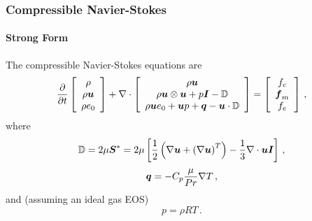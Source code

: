 \documentclass[18pt,xcolor=table]{beamer}
\begin{document}

\begin{frame}[t]
\frametitle{Compressible Navier-Stokes}
\framesubtitle{Strong Form}  %
The compressible Navier-Stokes equations are
\begin{align*}
\frac{\partial}{\partial t}\left[ \begin{array}{c} \rho\\ \rho\boldsymbol u\\ \rho e_0\\ \end{array} \right]
+\nabla\cdot\left[ \begin{array}{c} \rho\boldsymbol u\\ \rho\boldsymbol u\otimes\boldsymbol u+p\boldsymbol I-\mathbb{D}\\ \rho\boldsymbol u e_0+\boldsymbol u p+\boldsymbol q-\boldsymbol u\cdot\mathbb{D}\\ \end{array} \right]
=\left[ \begin{array}{c} f_c\\ \boldsymbol f_m\\ f_e\\ \end{array} \right]\,,
\end{align*}
where
\begin{equation*}
  \mathbb{D}=2\mu\boldsymbol S^*=2\mu\left[ \frac{1}{2}\left( \nabla\boldsymbol u+\left( \nabla\boldsymbol u \right)^T \right)-\frac{1}{3}\nabla\cdot\boldsymbol u\boldsymbol I \right]\,,
\end{equation*}
\begin{equation*}
  \boldsymbol q=-C_p\frac{\mu}{Pr}\nabla T\,,
\end{equation*}
and (assuming an ideal gas EOS)
\[
p=\rho R T\,.
\]
\end{frame}

\end{document}
